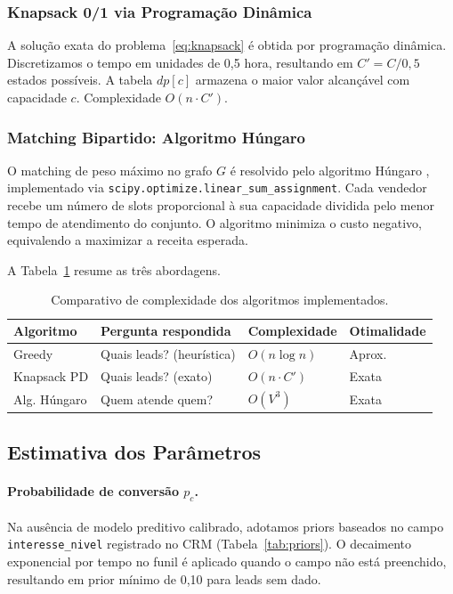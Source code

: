 \documentclass[12pt,a4paper]{article}
\begin{document}
\subsubsection{Knapsack 0/1 via Programa\c{c}\~{a}o Din\^{a}mica}

A solu\c{c}\~{a}o exata do problema~\eqref{eq:knapsack} \'{e} obtida por programa\c{c}\~{a}o din\^{a}mica.
Discretizamos o tempo em unidades de 0,5 hora, resultando em
$C' = C / 0{,}5$ estados poss\'{i}veis. A tabela $dp[c]$ armazena o maior valor
alcan\c{c}\'{a}vel com capacidade $c$. Complexidade $O(n \cdot C')$.

\subsubsection{Matching Bipartido: Algoritmo H\'{u}ngaro}

O matching de peso m\'{a}ximo no grafo $G$ \'{e} resolvido pelo algoritmo H\'{u}ngaro
\cite{kuhn1955hungarian}, implementado via \texttt{scipy.optimize.linear\_sum\_assignment}.
Cada vendedor recebe um n\'{u}mero de slots proporcional \`{a} sua capacidade dividida pelo
menor tempo de atendimento do conjunto. O algoritmo minimiza o custo negativo,
equivalendo a maximizar a receita esperada.

A Tabela~\ref{tab:complexidade} resume as tr\^{e}s abordagens.

\begin{table}[H]
\centering
\caption{Comparativo de complexidade dos algoritmos implementados.}
\label{tab:complexidade}
\begin{tabular}{llll}
\toprule
\textbf{Algoritmo} & \textbf{Pergunta respondida} & \textbf{Complexidade} & \textbf{Otimalidade} \\
\midrule
Greedy       & Quais leads? (heur\'{i}stica) & $O(n \log n)$   & Aprox. \\
Knapsack PD  & Quais leads? (exato)          & $O(n \cdot C')$ & Exata  \\
Alg. H\'{u}ngaro & Quem atende quem?         & $O(V^3)$        & Exata  \\
\bottomrule
\end{tabular}
\end{table}

\subsection{Estimativa dos Par\^{a}metros}

\paragraph{Probabilidade de convers\~{a}o $p_c$.}
Na aus\^{e}ncia de modelo preditivo calibrado, adotamos priors baseados no campo
\texttt{interesse\_nivel} registrado no CRM (Tabela~\ref{tab:priors}). O decaimento
exponencial por tempo no funil \'{e} aplicado quando o campo n\~{a}o est\'{a} preenchido,
resultando em prior m\'{i}nimo de 0,10 para leads sem dado.
\end{document}
